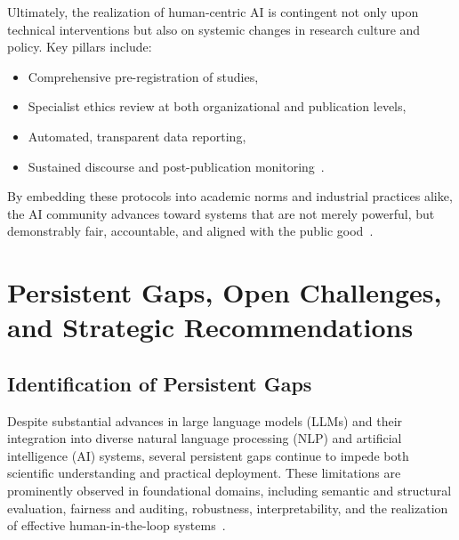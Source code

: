 \documentclass[sigconf]{acmart}
\begin{document}
Ultimately, the realization of human-centric AI is contingent not only upon technical interventions but also on systemic changes in research culture and policy. Key pillars include:
\begin{itemize}
    \item Comprehensive pre-registration of studies,
    \item Specialist ethics review at both organizational and publication levels,
    \item Automated, transparent data reporting,
    \item Sustained discourse and post-publication monitoring~\cite{ref40,ref52,ref53}.
\end{itemize}
By embedding these protocols into academic norms and industrial practices alike, the AI community advances toward systems that are not merely powerful, but demonstrably fair, accountable, and aligned with the public good~\cite{ref23,ref52,ref53,ref54,ref55}.

\section{Persistent Gaps, Open Challenges, and Strategic Recommendations}

\subsection{Identification of Persistent Gaps}

Despite substantial advances in large language models (LLMs) and their integration into diverse natural language processing (NLP) and artificial intelligence (AI) systems, several persistent gaps continue to impede both scientific understanding and practical deployment. These limitations are prominently observed in foundational domains, including semantic and structural evaluation, fairness and auditing, robustness, interpretability, and the realization of effective human-in-the-loop systems~\cite{ref2,ref7,ref10,ref12,ref13,ref15,ref16,ref17,ref18,ref19,ref20,ref22,ref24,ref25,ref26,ref28,ref30,ref31,ref32,ref33,ref34,ref36,ref37,ref38,ref39,ref42,ref43,ref44,ref46,ref47,ref48,ref49,ref50,ref52,ref53,ref54,ref55,ref56,ref57,ref58,ref59,ref60,ref66,ref67,ref68,ref69,ref70,ref76,ref77,ref78,ref79,ref80,ref86,ref87,ref88,ref89,ref90,ref91,ref92,ref93,ref94,ref95,ref96,ref97,ref98,ref99,ref100,ref101,ref102,ref103,ref104,ref105,ref106,ref107,ref108}.
\end{document}
